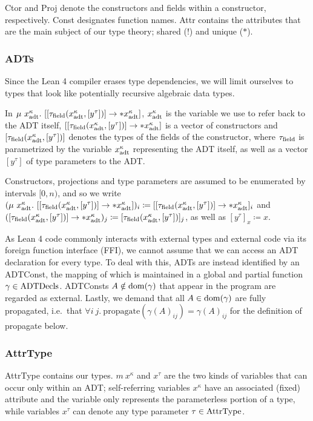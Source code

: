 Ctor and Proj denote the constructors and fields within a constructor, respectively. Const designates function names. Attr contains the attributes that are the main subject of our type theory; shared (!) and unique ($*$). 

\subsubsection{ADTs}
Since the Lean 4 compiler erases type dependencies, we will limit ourselves to types that look like potentially recursive algebraic data types. 

\sloppy In $\mu\ x^\kappa_\adt.\ [[\tau_\field(x^\kappa_\adt, [y^\tau])] \to *x^\kappa_\adt]$, $x^\kappa_{\mathrm{adt}}$ is the variable we use to refer back to the ADT itself, $[[\tau_{\mathrm{field}}(x^\kappa_{\mathrm{adt}}, [y^\tau])] \to *x^\kappa_{\mathrm{adt}}]$ is a vector of constructors and $[\tau_{\mathrm{field}}(x^\kappa_{\mathrm{adt}}, [y^\tau])]$ denotes the types of the fields of the constructor, where $\tau_{\mathrm{field}}$ is parametrized by the variable $x^\kappa_{\mathrm{adt}}$ representing the ADT itself, as well as a vector $[y^\tau]$ of type parameters to the ADT. 

Constructors, projections and type parameters are assumed to be enumerated by intervals $[0, n)$, and so we write $(\mu\ x^\kappa_\adt.\ [[\tau_\field(x^\kappa_\adt, [y^\tau])] \to *x^\kappa_\adt])_i \coloneqq [[\tau_\field(x^\kappa_\adt, [y^\tau])] \to *x^\kappa_\adt]_i$ and $([\tau_{\mathrm{field}}(x^\kappa_{\mathrm{adt}}, [y^\tau])] \to *x^\kappa_{\mathrm{adt}})_j \coloneqq [\tau_{\mathrm{field}}(x^\kappa_{\mathrm{adt}}, [y^\tau])]_j$, as well as $[y^\tau]_x \coloneqq x$. 

As Lean 4 code commonly interacts with external types and external code via its foreign function interface (FFI), we cannot assume that we can access an ADT declaration for every type. To deal with this, ADTs are instead identified by an ADTConst, the mapping of which is maintained in a global and partial function $\gamma \in \mathrm{ADTDecls}$. ADTConsts $A \notin \mathrm{dom}(\gamma)$ that appear in the program are regarded as external. Lastly, we demand that all $A \in \mathrm{dom}(\gamma)$ are fully propagated, i.e.\ that $\forall i\ j.\ \mathrm{propagate}(\gamma(A)_{ij}) = \gamma(A)_{ij}$ for the definition of propagate below.

\subsubsection{AttrType}
AttrType contains our types. $m\ x^\kappa$ and $x^\tau$ are the two kinds of variables that can occur only within an ADT; self-referring variables $x^\kappa$ have an associated (fixed) attribute and the variable only represents the parameterless portion of a type, while variables $x^\tau$ can denote any type parameter $\tau \in \mathrm{AttrType}$. 

